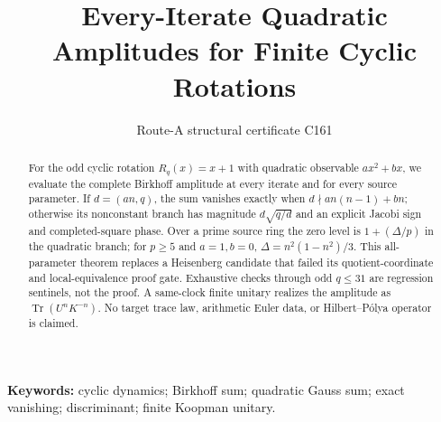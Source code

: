\documentclass[10pt]{article}
\title{\vspace{-1.5em}Every-Iterate Quadratic Amplitudes for Finite Cyclic Rotations}
\author{Route-A structural certificate C161}
\date{}
\begin{document}
\maketitle
\begin{abstract}
For the odd cyclic rotation $R_q(x)=x+1$ with quadratic observable
$ax^2+bx$, we evaluate the complete Birkhoff amplitude at every iterate and
for every source parameter.  If $d=(an,q)$, the sum vanishes exactly when
$d\nmid an(n-1)+bn$; otherwise its nonconstant branch has magnitude
$d\sqrt{q/d}$ and an explicit Jacobi sign and completed-square phase.  Over a
prime source ring the zero level is $1+(\Delta/p)$ in the quadratic branch;
for $p\ge5$ and $a=1,b=0$, $\Delta=n^2(1-n^2)/3$.  This all-parameter
theorem replaces a
Heisenberg candidate that failed its quotient-coordinate and local-equivalence
proof gate.  Exhaustive checks through odd $q\le31$ are regression sentinels,
not the proof.  A same-clock finite unitary realizes the amplitude as
$\operatorname{Tr}(U^nK^{-n})$.  No target trace law, arithmetic Euler data,
or Hilbert--P\'olya operator is claimed.
\end{abstract}
\noindent\textbf{Keywords:} cyclic dynamics; Birkhoff sum; quadratic Gauss
sum; exact vanishing; discriminant; finite Koopman unitary.
\end{document}
